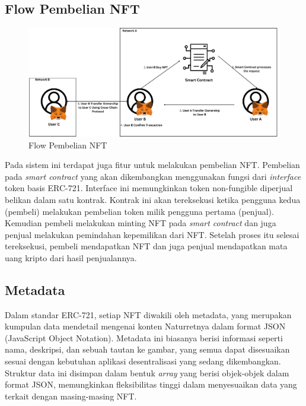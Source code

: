 \subsection{Flow Pembelian NFT}
\begin{figure} [H] \centering
  \includegraphics[scale=0.20]{gambar/flow_transaksi_new.png}
  \caption{Flow Pembelian NFT}
  \label{fig:flowtransaksi}
\end{figure}

Pada sistem ini terdapat juga fitur untuk melakukan pembelian NFT. Pembelian pada \emph{smart contract} yang akan dikembangkan menggunakan fungsi dari \emph{interface} token basis ERC-721. Interface ini memungkinkan token non-fungible diperjual belikan dalam satu kontrak. Kontrak ini akan tereksekusi ketika pengguna kedua (pembeli) melakukan pembelian token milik pengguna pertama (penjual). Kemudian pembeli melakukan minting NFT pada \emph{smart contract} dan juga penjual melakukan pemindahan kepemilikan dari NFT. Setelah proses itu selesai tereksekusi, pembeli mendapatkan NFT dan juga penjual mendapatkan mata uang kripto dari hasil penjualannya.

\subsection{Metadata}



Dalam standar ERC-721, setiap NFT diwakili oleh metadata, yang merupakan kumpulan data mendetail mengenai konten Naturretnya dalam format JSON (JavaScript Object Notation). Metadata ini biasanya berisi informasi seperti nama, deskripsi, dan sebuah tautan ke gambar, yang semua dapat disesuaikan sesuai dengan kebutuhan aplikasi desentralisasi yang sedang dikembangkan. Struktur data ini disimpan dalam bentuk \emph{array} yang berisi objek-objek dalam format JSON, memungkinkan fleksibilitas tinggi dalam menyesuaikan data yang terkait dengan masing-masing NFT.

